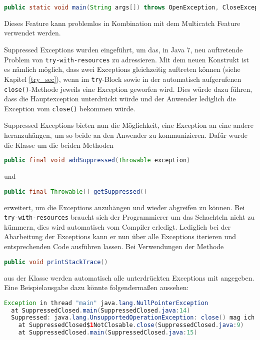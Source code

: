 \documentclass[times, 10pt,twocolumn]{article}
\begin{document}
\begin{lstlisting}[language=java,breaklines=true]
public static void main(String args[]) throws OpenException, CloseException
\end{lstlisting}

Dieses Feature kann problemlos in Kombination mit dem Multicatch Feature verwendet werden.

\label{supp_exception_subsec}
Suppressed Exceptions wurden eingeführt, um das, in Java 7, neu auftretende Problem von \texttt{try-with-resources} zu adressieren.
Mit dem neuen Konstrukt ist es nämlich möglich, dass zwei Exceptions gleichzeitig auftreten können (siehe Kapitel \ref{try_sec}), wenn im
\texttt{try}-Block sowie in der automatisch aufgerufenen \texttt{close()}-Methode jeweils eine Exception geworfen wird. Dies würde
dazu führen, dass die Hauptexception unterdrückt würde und der Anwender lediglich die Exception vom \texttt{close()} bekommen würde.

Suppressed Exceptions bieten nun die Möglichkeit, eine Exception an eine andere heranzuhängen, um so beide an den Anwender zu
kommunizieren. Dafür wurde die Klasse  um die beiden Methoden 
\begin{lstlisting}[language=java,breaklines=true]
public final void addSuppressed(Throwable exception)
\end{lstlisting}
und 
\begin{lstlisting}[language=java,breaklines=true]
public final Throwable[] getSuppressed()
\end{lstlisting}
erweitert, um die Exceptions anzuhängen und wieder abgreifen zu können. 
Bei \texttt{try-with-resources} braucht sich der Programmierer um das Schachteln nicht zu kümmern, dies wird 
automatisch vom Compiler erledigt.\cite{sbJ7coin} Lediglich bei der Abarbeitung der Exceptions kann er nun über
alle Exceptions iterieren und entsprechenden Code ausführen lassen. Bei Verwendungen der Methode
\begin{lstlisting}[language=java,breaklines=true]
public void printStackTrace()
\end{lstlisting}
aus der Klasse  werden automatisch alle unterdrückten Exceptions mit angegeben. Eine Beispielausgabe dazu könnte
folgendermaßen aussehen\cite{javainsel2}:
\begin{lstlisting}[language=java,breaklines=true]
Exception in thread "main" java.lang.NullPointerException
  at SuppressedClosed.main(SuppressedClosed.java:14)
  Suppressed: java.lang.UnsupportedOperationException: close() mag ich nicht
    at SuppressedClosed$1NotClosable.close(SuppressedClosed.java:9)
    at SuppressedClosed.main(SuppressedClosed.java:15)
\end{lstlisting}
\end{document}
